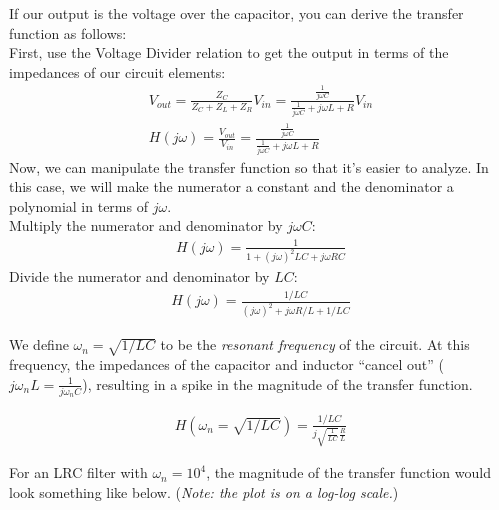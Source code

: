 If our output is the voltage over the capacitor, you can derive the transfer function as follows: \\

First, use the Voltage Divider relation to get the output in terms of the impedances of our circuit elements:
\begin{align*}
    V_{out} = \frac{Z_C}{Z_C + Z_L + Z_R} V_{in} = \frac{\frac{1}{j\omega C}}{\frac{1}{j\omega C} + j\omega L + R} V_{in} \\
    H(j\omega) = \frac{V_{out}}{V_{in}} = \frac{\frac{1}{j\omega C}}{\frac{1}{j\omega C} + j\omega L + R}
\end{align*}
Now, we can manipulate the transfer function so that it's easier to analyze. In this case, we will make the numerator a constant and the denominator a polynomial in terms of $j\omega$. \\

Multiply the numerator and denominator by $j\omega C$:
\begin{align*}
    H(j\omega) = \frac{1}{1 + (j\omega)^2LC + j\omega RC}
\end{align*}
Divide the numerator and denominator by $LC$:
\begin{align*}
    H(j\omega) = \frac{1/LC}{(j \omega)^2 + j \omega R/L + 1/LC}
\end{align*}

We define $\omega_n = \sqrt{1/LC}$ to be the \textit{resonant frequency} of the circuit.
At this frequency, the impedances of the capacitor and inductor ``cancel out'' ($j \omega_n L = \frac{1}{j \omega_n C}$), resulting in a spike in the magnitude of the transfer function.

\begin{align*}
    H(\omega_n = \sqrt{1/LC}) = \frac{1/LC}{j\sqrt{\frac{1}{LC}} \frac{R}{L}}
\end{align*}

For an LRC filter with $\omega_n = 10^4$, the magnitude of the transfer function would look something like below. (\textit{Note: the plot is on a log-log scale.}) \\
\begin{center}
\end{center}